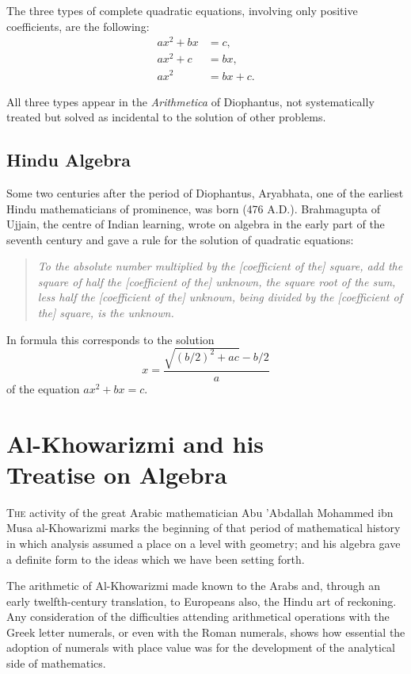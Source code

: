 \documentclass[11pt,a4paper]{book}
\begin{document}
The three types of complete quadratic equations, involving only positive coefficients, are the following:
\begin{align}
ax^2 + bx &= c,\\
ax^2 + c &= bx,\\
ax^2 &= bx + c.
\end{align}

All three types appear in the \textit{Arithmetica} of Diophantus, not systematically treated but solved as incidental to the solution of other problems.

\section{Hindu Algebra}

Some two centuries after the period of Diophantus, Aryabhata, one of the earliest Hindu mathematicians of prominence, was born (476 A.D.). Brahmagupta of Ujjain, the centre of Indian learning, wrote on algebra in the early part of the seventh century and gave a rule for the solution of quadratic equations:

\begin{quote}
\textit{To the absolute number multiplied by the [coefficient of the] square, add the square of half the [coefficient of the] unknown, the square root of the sum, less half the [coefficient of the] unknown, being divided by the [coefficient of the] square, is the unknown.}
\end{quote}

In formula this corresponds to the solution
\[x = \frac{\sqrt{(b/2)^2 + ac} - b/2}{a}\]
of the equation $ax^2 + bx = c$.

\chapter[Al-Khowarizmi and his Treatise on Algebra]{Al-Khowarizmi and his\\ Treatise on Algebra}

\lettrine[lines=3]{T}{he} activity of the great Arabic mathematician Abu 'Abdallah Mohammed ibn Musa al-Khowarizmi marks the beginning of that period of mathematical history in which analysis assumed a place on a level with geometry; and his algebra gave a definite form to the ideas which we have been setting forth.

The arithmetic of Al-Khowarizmi made known to the Arabs and, through an early twelfth-century translation, to Europeans also, the Hindu art of reckoning. Any consideration of the difficulties attending arithmetical operations with the Greek letter numerals, or even with the Roman numerals, shows how essential the adoption of numerals with place value was for the development of the analytical side of mathematics.
\end{document}
